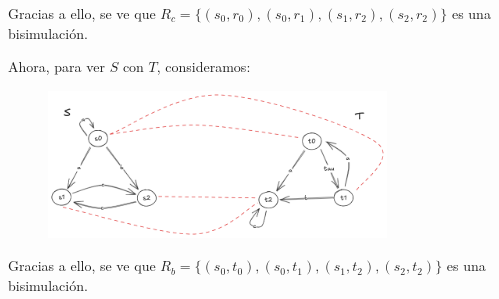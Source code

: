 \documentclass{article}
\begin{document}
Gracias a ello, se ve que $R_c = \{(s_0, r_0), (s_0, r_1), (s_1, r_2), (s_2, r_2)\}$ es una bisimulación.

Ahora, para ver $S$ con $T$, consideramos:
\begin{figure}[!htb]
	\includegraphics[width=0.8\textwidth]{02-16-b.png}
	\centering
\end{figure}

Gracias a ello, se ve que $R_b = \{(s_0, t_0), (s_0, t_1), (s_1, t_2), (s_2, t_2)\}$ es una bisimulación.
\end{document}
